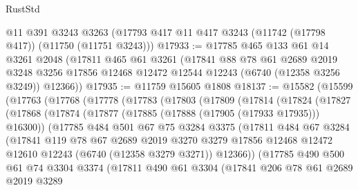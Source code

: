 \begin{lexlean}{RustStd}
\begin{coremodule}
    @11
    @391
    @3243
    @3263
    (@17793 @417 @11 @417 @3243 (@11742 (@17798 @417)) (@11750 (@11751 @3243)))
@17933 := @17785
    @465
    @133
    @61
    @14
    @3261
    @2048
    (@17811
      @465
      @61
      @3261
      (@17841
        @88
        @78
        @61
        @2689
        @2019
        @3248
        @3256
        @17856
        @12468
        @12472
        @12544
        @12243
        (@6740 (@12358 @3256 @3249))
        @12366))
@17935 := @11759 @15605 @1808
@18137 := @15582
    (@15599
      (@17763
        (@17768
          (@17778
            (@17783
              (@17803
                (@17809
                  (@17814
                    (@17824
                      (@17827
                        (@17868
                          (@17874
                            (@17877 (@17885 (@17888 (@17905 (@17933 @17935))) @16300))
                            (@17785
                              @484
                              @501
                              @67
                              @75
                              @3284
                              @3375
                              (@17811
                                @484
                                @67
                                @3284
                                (@17841
                                  @119
                                  @78
                                  @67
                                  @2689
                                  @2019
                                  @3270
                                  @3279
                                  @17856
                                  @12468
                                  @12472
                                  @12610
                                  @12243
                                  (@6740 (@12358 @3279 @3271))
                                  @12366))
                              (@17785
                                @490
                                @500
                                @61
                                @74
                                @3304
                                @3374
                                (@17811
                                  @490
                                  @61
                                  @3304
                                  (@17841
                                    @206
                                    @78
                                    @61
                                    @2689
                                    @2019
                                    @3289

\end{coremodule}
\end{lexlean}
